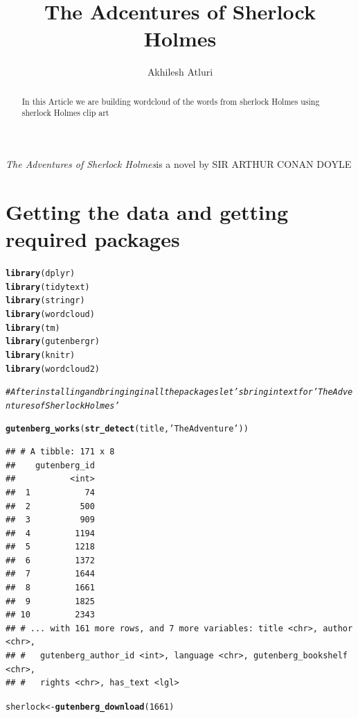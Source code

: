 \documentclass{article}\usepackage[]{graphicx}\usepackage[]{color}
\makeatletter
\newcommand{\hlnum}[1]{\textcolor[rgb]{0.686,0.059,0.569}{#1}}%
\newcommand{\hlstr}[1]{\textcolor[rgb]{0.192,0.494,0.8}{#1}}%
\newcommand{\hlcom}[1]{\textcolor[rgb]{0.678,0.584,0.686}{\textit{#1}}}%
\newcommand{\hlstd}[1]{\textcolor[rgb]{0.345,0.345,0.345}{#1}}%
\newcommand{\hlkwb}[1]{\textcolor[rgb]{0.69,0.353,0.396}{#1}}%
\newcommand{\hlkwd}[1]{\textcolor[rgb]{0.737,0.353,0.396}{\textbf{#1}}}%
\newenvironment{kframe}{%
 \def\at@end@of@kframe{}%
 \ifinner\ifhmode%
  \def\at@end@of@kframe{\end{minipage}}%
  \begin{minipage}{\columnwidth}%
 \fi\fi%
 \def\FrameCommand##1{\hskip\@totalleftmargin \hskip-\fboxsep
 \colorbox{shadecolor}{##1}\hskip-\fboxsep
     \hskip-\linewidth \hskip-\@totalleftmargin \hskip\columnwidth}%
 \MakeFramed {\advance\hsize-\width
   \@totalleftmargin\z@ \linewidth\hsize
   \@setminipage}}%
 {\par\unskip\endMakeFramed%
 \at@end@of@kframe}
\newenvironment{knitrout}{}{} %
\makeatother
\begin{document}
\title{The Adcentures of Sherlock Holmes}
\author{Akhilesh Atluri}
\maketitle

\begin{abstract}

In this Article we are building wordcloud of the words from sherlock Holmes using sherlock Holmes clip art

\end{abstract}

\textit{The Adventures of Sherlock Holmes}is a novel by SIR ARTHUR CONAN DOYLE

\section{Getting the data and getting required packages}

\begin{knitrout}
\color{fgcolor}\begin{kframe}
\begin{alltt}
\hlkwd{library}\hlstd{(dplyr)}
\hlkwd{library}\hlstd{(tidytext)}
\hlkwd{library}\hlstd{(stringr)}
\hlkwd{library}\hlstd{(wordcloud)}
\hlkwd{library}\hlstd{(tm)}
\hlkwd{library}\hlstd{(gutenbergr)}
\hlkwd{library}\hlstd{(knitr)}
\hlkwd{library}\hlstd{(wordcloud2)}

\hlcom{#After installing and bringing in all the packages let's bring in text for 'The Adventures of Sherlock Holmes'}

\hlkwd{gutenberg_works}\hlstd{(}\hlkwd{str_detect}\hlstd{(title,}\hlstr{'The Adventure'}\hlstd{))}
\end{alltt}
\begin{verbatim}
## # A tibble: 171 x 8
##    gutenberg_id
##           <int>
##  1           74
##  2          500
##  3          909
##  4         1194
##  5         1218
##  6         1372
##  7         1644
##  8         1661
##  9         1825
## 10         2343
## # ... with 161 more rows, and 7 more variables: title <chr>, author <chr>,
## #   gutenberg_author_id <int>, language <chr>, gutenberg_bookshelf <chr>,
## #   rights <chr>, has_text <lgl>
\end{verbatim}
\begin{alltt}
\hlstd{sherlock}\hlkwb{<-}\hlkwd{gutenberg_download}\hlstd{(}\hlnum{1661}\hlstd{)}
\end{alltt}
\end{kframe}
\end{knitrout}
\end{document}
